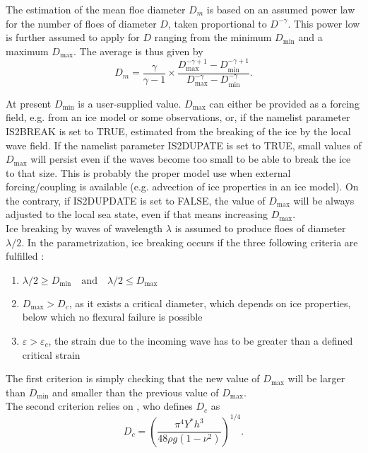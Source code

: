 The estimation of the mean floe diameter $D_m$ is based on an assumed power law for the number of 
floes of diameter $D$, taken  proportional to $D^{-\gamma}$. This power low is further assumed to 
apply for $D$ ranging from 
the minimum $D_{\min}$ and a maximum $D_{\max}$. The average is thus given by  
\begin{equation}
D_m=\frac{\gamma}{\gamma -1}\times\frac{D_{\max}^{-\gamma +1}-D_{\min}^{-\gamma +1}}{D_{\max}^{-\gamma}-D_{\min}^{-\gamma}}.
\label{analytic_Dbar}
\end{equation}

\noindent
At present $D_{\min}$ is a user-supplied value. $D_{\max}$ can either be 
provided as a forcing field, e.g. from an 
ice model or some observations, or, if the namelist parameter {\code IS2BREAK} is set to {\code TRUE}, 
estimated from 
the breaking of the ice by the local wave field. If the namelist parameter {\code IS2DUPATE}  is set to  
{\code TRUE}, small values of $D_{\max}$ will persist even if the waves become too small to be able to break the ice to 
that size. This is probably the proper model 
use when  external forcing/coupling is available (e.g. advection of ice properties in an ice model). 
 On the contrary, if {\code IS2DUPDATE} is set to  {\code FALSE}, the value of $D_{\max}$ will be always adjusted to the local sea state, 
even if that means increasing $D_{\max}$.\\


Ice breaking by waves of wavelength $\lambda$ is assumed to produce floes of diameter $\lambda / 2$. 
In the parametrization, ice breaking occurs if the three following criteria are fulfilled \citep{art:Wea13}:
\begin{enumerate}
\item $\lambda/2 \geq D_{\min} \quad \mathrm{and} \quad  \lambda/2 \leq D_{\max}$
\item $D_{\max}>D_c$, as it exists a critical diameter, which depends on ice properties, below which no flexural failure is possible
\item $\varepsilon>\varepsilon_c$, the strain due to the incoming wave has to 
be greater than a defined critical strain
\end{enumerate}
The first criterion is simply checking that the new value of $D_{\max}$ will be larger than $D_{\min}$ and smaller 
than the previous value of $D_{\max}$.\\

The second criterion relies on \cite{inc:M86}, who defines $D_{c}$ as
\begin{equation}
D_{c}=\left(\frac{\pi^4 Y^* h^3}{48 \rho g (1 -\nu ^2)}\right)^{1/4}. 
\end{equation}

